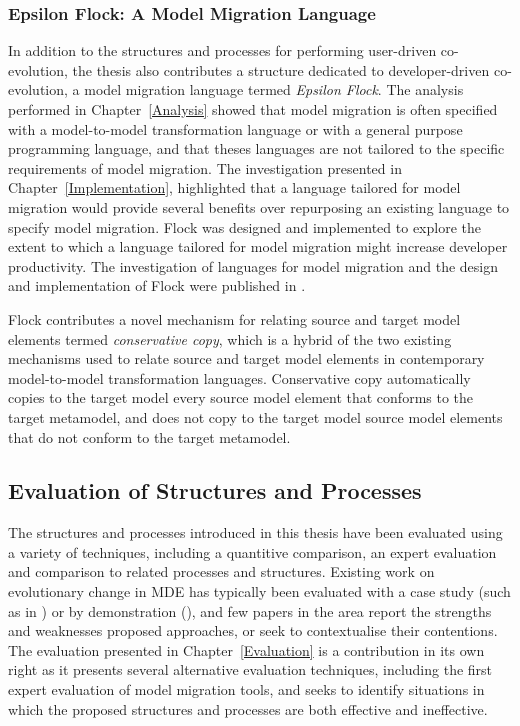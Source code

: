 \subsubsection{Epsilon Flock: A Model Migration Language}
In addition to the structures and processes for performing user-driven co-evolution, the thesis also contributes a structure dedicated to developer-driven co-evolution, a model migration language termed \emph{Epsilon Flock}. The analysis performed in Chapter~\ref{Analysis} showed that model migration is often specified with a model-to-model transformation language or with a general purpose programming language, and that theses languages are not tailored to the specific requirements of model migration. The investigation presented in Chapter~\ref{Implementation}, highlighted that a language tailored for model migration would provide several benefits over repurposing an existing language to specify model migration. Flock was designed and implemented to explore the extent to which a language tailored for model migration might increase developer productivity. The investigation of languages for model migration and the design and implementation of Flock were published in \cite{rose10flock}.

Flock contributes a novel mechanism for relating source and target model elements termed \emph{conservative copy}, which is a hybrid of the two existing mechanisms used to relate source and target model elements in contemporary model-to-model transformation languages. Conservative copy automatically copies to the target model every source model element that conforms to the target metamodel, and does not copy to the target model source model elements that do not conform to the target metamodel.


\subsection{Evaluation of Structures and Processes}
The structures and processes introduced in this thesis have been evaluated using a variety of techniques, including a quantitive comparison, an expert evaluation and comparison to related processes and structures. Existing work on evolutionary change in MDE has typically been evaluated with a case study (such as in \cite{sprinkle03thesis}) or by demonstration (\cite{cicchetti08thesis}), and few papers in the area report the strengths and weaknesses proposed approaches, or seek to contextualise their contentions. The evaluation presented in Chapter~\ref{Evaluation} is a contribution in its own right as it presents several alternative evaluation techniques, including the first expert evaluation of model migration tools, and seeks to identify situations in which the proposed structures and processes are both effective and ineffective.

